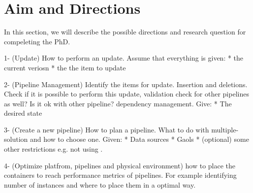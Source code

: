 \section{Aim and Directions}
\label{sec:aim}
In this section, we will describe the possible directions and research question for compeleting the PhD.

1- (Update) How to perform an update. Assume that everything is given:  
                    * the current veriosn
                    * the the item to update

2- (Pipeline Management) Identify the items for update. Insertion and deletions. Check if it is possible to perform this update, validation check for other pipelines as well? Is it ok with other pipeline? dependency management. Give:
                    * The desired state

3- (Create a new pipeline) How to plan a pipeline. What to do with multiple-solution and how to choose one. Given:
                    * Data sources
                    * Gaols
                    * (optional) some other restrictions e.g. not using .

4- (Optimize platfrom, pipelines and physical environment) how to place the containers to reach performance metrics of pipelines. For example identifying number of instances and where to place them in a optimal way. 

